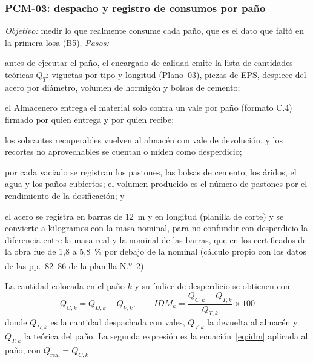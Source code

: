 \subsubsection{PCM-03: despacho y registro de consumos por paño} \emph{Objetivo:} medir lo que realmente consume cada paño, que es el dato que faltó en la primera losa (B5). \emph{Pasos:}
\begin{enumerate*}[label=(\arabic*)]
  \item antes de ejecutar el paño, el encargado de calidad emite la lista de cantidades teóricas $Q_T$: viguetas por tipo y longitud (Plano~03), piezas de EPS, despiece del acero por diámetro, volumen de hormigón y bolsas de cemento;
  \item el Almacenero entrega el material solo contra un vale por paño (formato C.4) firmado por quien entrega y por quien recibe;
  \item los sobrantes recuperables vuelven al almacén con vale de devolución, y los recortes no aprovechables se cuentan o miden como desperdicio;
  \item por cada vaciado se registran los pastones, las bolsas de cemento, los áridos, el agua y los paños cubiertos; el volumen producido es el número de pastones por el rendimiento de la dosificación; y
  \item el acero se registra en barras de 12~m y en longitud (planilla de corte) y se convierte a kilogramos con la masa nominal, para no confundir con desperdicio la diferencia entre la masa real y la nominal de las barras, que en los certificados de la obra fue de 1,8 a 5,8~\% por debajo de la nominal (cálculo propio con los datos de las pp.~82--86 de la planilla N.\textsuperscript{o}~2).
\end{enumerate*}
La cantidad colocada en el paño $k$ y su índice de desperdicio se obtienen con
\begin{equation}
  Q_{C,k} = Q_{D,k} - Q_{V,k}, \qquad IDM_{k} = \frac{Q_{C,k} - Q_{T,k}}{Q_{T,k}} \times 100
  \label{eq:consumo-pano}
\end{equation}
donde $Q_{D,k}$ es la cantidad despachada con vales, $Q_{V,k}$ la devuelta al almacén y $Q_{T,k}$ la teórica del paño. La segunda expresión es la ecuación~\eqref{eq:idm} aplicada al paño, con $Q_{\text{real}} = Q_{C,k}$.

